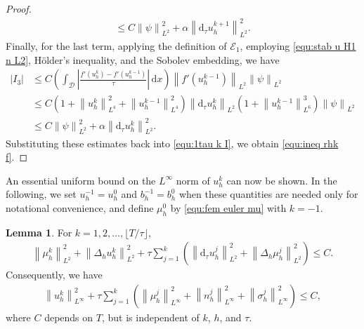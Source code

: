 \documentclass[11pt, reqno]{amsart}
\theoremstyle{definition}
\newtheorem{lemma}[theorem]{Lemma}
\numberwithin{equation}{section}
\newcommand{\dtt}{\mathrm{d}_\tau}
\newcommand{\dx}{\mathrm{d}x}
\newcommand{\norm}[2]{\left\|{#1}\right\|_{#2}}
\newcommand{\abs}[1]{\left|{#1}\right|}
\begin{document}
\begin{proof}
\begin{align}
	\leq 
	C\norm{\psi}{L^2}^2 + \alpha \norm{\dtt u_h^{k+1}}{L^2}^2.
\end{align}
Finally, for the last term, applying the definition of $\mathcal{E}_1$, employing \eqref{equ:stab u H1 n L2}, H\"older's inequality, and the Sobolev embedding, we have
\begin{align}\label{equ:I3 tau}
	\abs{I_3}
	&\leq
	C \left(\int_{\mathscr{D}} \abs{\frac{f'(u_h^k)-f'(u_h^{k-1})}{\tau}} \,\dx \right) \norm{f'(u_h^{k-1})}{L^2} \norm{\psi}{L^2}
	\nonumber\\
	&\leq
	C \left(1+ \norm{u_h^k}{L^4}^2 + \norm{u_h^{k-1}}{L^4}^2 \right) \norm{\dtt u_h^k}{L^2} \left(1+ \norm{u_h^{k-1}}{L^6}^3\right) \norm{\psi}{L^2}
	\nonumber\\
	&\leq
	C\norm{\psi}{L^2}^2 + \alpha \norm{\dtt u_h^k}{L^2}^2.
\end{align}
Substituting these estimates back into \eqref{equ:1tau k I}, we obtain \eqref{equ:ineq rhk f}.
\end{proof}

An essential uniform bound on the $L^\infty$ norm of $u_h^k$ can now be shown. In the following, we set $u_h^{-1}=u_h^0$ and $b_h^{-1}=b_h^0$ when these quantities are needed only for notational convenience, and define $\mu_h^0$ by \eqref{equ:fem euler mu} with $k=-1$.

\begin{lemma}
For $k=1,2,\ldots, \lfloor T/\tau \rfloor$,
\begin{align}\label{equ:stab Delta u L2}
	\norm{\mu_h^k}{L^2}^2 + \norm{\Delta_h u_h^k}{L^2}^2 + \tau \sum_{j=1}^k \left(\norm{\dtt u_h^j}{L^2}^2 + \norm{\Delta_h \mu_h^j}{L^2}^2 \right)
	\leq C.
\end{align}
Consequently, we have
\begin{align}\label{equ:stab u Linfty}
	\norm{u_h^k}{L^\infty}^2
    +
    \tau \sum_{j=1}^k \left(\norm{\mu_h^j}{L^\infty}^2 + \norm{n_h^j}{L^\infty}^2 + \norm{\sigma_h^j}{L^\infty}^2 \right) \leq C,
\end{align}
where $C$ depends on $T$, but is independent of $k$, $h$, and $\tau$.
\end{lemma}
\end{document}
